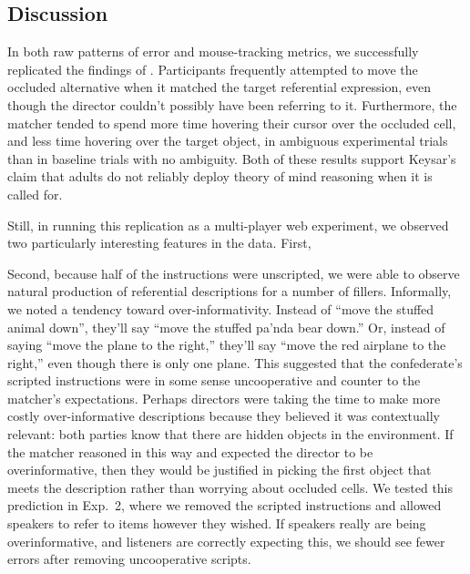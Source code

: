 \documentclass[manuscript]{stjour}
\begin{document}
\subsection{Discussion}

In both raw patterns of error and mouse-tracking metrics, we successfully replicated the findings of \cite{KeysarLinBarr03_LimitsOnTheoryOfMindUse}. Participants frequently attempted to move the occluded alternative when it matched the target referential expression, even though the director couldn't possibly have been referring to it. Furthermore, the matcher tended to spend more time hovering their cursor over the occluded cell, and less time hovering over the target object, in ambiguous experimental trials than in baseline trials with no ambiguity. Both of these results support Keysar's claim that adults do not reliably deploy theory of mind reasoning when it is called for.

Still, in running this replication as a multi-player web experiment, we observed two particularly interesting features in the data. First, 

Second, because half of the instructions were unscripted, we were able to observe natural production of referential descriptions for a number of fillers. Informally, we noted a tendency toward over-informativity. Instead of ``move the stuffed animal down'', they'll say ``move the stuffed pa'nda bear down.'' Or, instead of saying ``move the plane to the right,'' they'll say ``move the red airplane to the right,'' even though there is only one plane. This suggested that the confederate's scripted instructions were in some sense uncooperative and counter to the matcher's expectations. Perhaps directors were taking the time to make more costly over-informative descriptions because they believed it was contextually relevant: both parties know that there are hidden objects in the environment. If the matcher reasoned in this way and expected the director to be overinformative, then they would be justified in picking the first object that meets the description rather than worrying about occluded cells. We tested this prediction in Exp.~2, where we removed the scripted instructions and allowed speakers to refer to items however they wished. If speakers really are being overinformative, and listeners are correctly expecting this, we should see fewer errors after removing uncooperative scripts.
\end{document}
